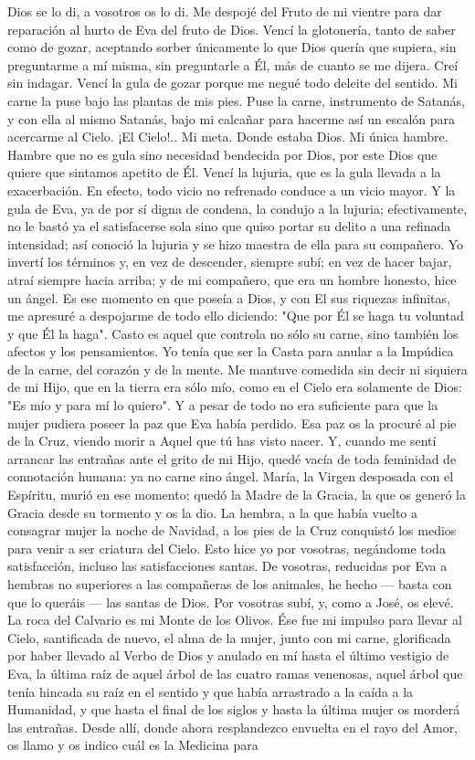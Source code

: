 \documentclass[12pt]{book} %
\begin{document}
Dios se lo di, a vosotros os lo di. Me despojé del Fruto de mi vientre para dar reparación al hurto de Eva del fruto de Dios. Vencí la glotonería, tanto de saber como de gozar, aceptando sorber únicamente lo que Dios quería que supiera, sin preguntarme a mí misma, sin preguntarle a Él, más de cuanto se me dijera. Creí sin indagar. Vencí la gula de gozar porque me negué todo deleite del sentido. Mi carne la puse bajo las plantas de mis pies. Puse la carne, instrumento de Satanás, y con ella al mismo Satanás, bajo mi calcañar para hacerme así un escalón para acercarme al Cielo. ¡El Cielo!.. Mi meta. Donde estaba Dios. Mi única hambre. Hambre que no es gula sino necesidad bendecida por Dios, por este Dios que quiere que sintamos apetito de Él. Vencí la lujuria, que es la gula llevada a la exacerbación. En efecto, todo vicio no refrenado conduce a un vicio mayor. Y la gula de Eva, ya de por sí digna de condena, la condujo a la lujuria; efectivamente, no le bastó ya el satisfacerse sola sino que quiso portar su delito a una refinada intensidad; así conoció la lujuria y se hizo maestra de ella para su compañero. Yo invertí los términos y, en vez de descender, siempre subí; en vez de hacer bajar, atraí siempre hacia arriba; y de mi compañero, que era un hombre honesto, hice un ángel. Es ese momento en que poseía a Dios, y con El sus riquezas infinitas, me apresuré a despojarme de todo ello diciendo: "Que por Él se haga tu voluntad y que Él la haga". Casto es aquel que controla no sólo su carne, sino también los afectos y los pensamientos. Yo tenía que ser la Casta para anular a la Impúdica de la carne, del corazón y de la mente. Me mantuve comedida sin decir ni siquiera de mi Hijo, que en la tierra era sólo mío, como en el Cielo era solamente de Dios: "Es mío y para mí lo quiero". Y a pesar de todo no era suficiente para que la mujer pudiera poseer la paz que Eva había perdido. Esa paz os la procuré al pie de la Cruz, viendo morir a Aquel que tú has visto nacer. Y, cuando me sentí arrancar las entrañas ante el grito de mi Hijo, quedé vacía de toda feminidad de connotación humana: ya no carne sino ángel. María, la Virgen desposada con el Espíritu, murió en ese momento; quedó la Madre de la Gracia, la que os generó la Gracia desde su tormento y os la dio. La hembra, a la que había vuelto a consagrar mujer la noche de Navidad, a los pies de la Cruz conquistó los medios para venir a ser criatura del Cielo. Esto hice yo por vosotras, negándome toda satisfacción, incluso las satisfacciones santas. De vosotras, reducidas por Eva a hembras no superiores a las compañeras de los animales, he hecho — basta con que lo queráis — las santas de Dios. Por vosotras subí, y, como a José, os elevé. La roca del Calvario es mi Monte de los Olivos. Ése fue mi impulso para llevar al Cielo, santificada de nuevo, el alma de la mujer, junto con mi carne, glorificada por haber llevado al Verbo de Dios y anulado en mí hasta el último vestigio de Eva, la última raíz de aquel árbol de las cuatro ramas venenosas, aquel árbol que tenía hincada su raíz en el sentido y que había arrastrado a la caída a la Humanidad, y que hasta el final de los siglos y hasta la última mujer os morderá las entrañas. Desde allí, donde ahora resplandezco envuelta en el rayo del Amor, os llamo y os indico cuál es la Medicina para 
\end{document}
